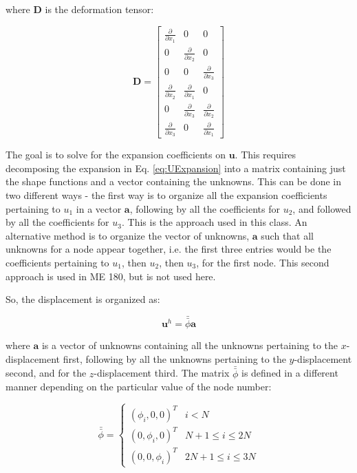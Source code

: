 \documentclass[10pt]{article}
\begin{document}
where \(\textbf{D}\) is the deformation tensor:

\begin{equation}
\label{eq:D}
\textbf{D}=\begin{bmatrix}\frac{\partial}{\partial x_1} & 0 & 0\\
0 & \frac{\partial}{\partial x_2} & 0\\
0 & 0 & \frac{\partial}{\partial x_3}\\
\frac{\partial}{\partial x_2} & \frac{\partial}{\partial x_1} & 0\\
0 & \frac{\partial}{\partial x_3} & \frac{\partial}{\partial x_2}\\
\frac{\partial}{\partial x_3} & 0 & \frac{\partial}{\partial x_1}\end{bmatrix}
\end{equation}

The goal is to solve for the expansion coefficients on \(\textbf{u}\). This requires decomposing the expansion in Eq. \eqref{eq:UExpansion} into a matrix containing just the shape functions and a vector containing the unknowns. This can be done in two different ways - the first way is to organize all the expansion coefficients pertaining to \(u_1\) in a vector \(\textbf{a}\), following by all the coefficients for \(u_2\), and followed by all the coefficients for \(u_3\). This is the approach used in this class. An alternative method is to organize the vector of unknowns, \(\textbf{a}\) such that all unknowns for a node appear together, i.e. the first three entries would be the coefficients pertaining to \(u_1\), then \(u_2\), then \(u_3\), for the first node. This second approach is used in ME 180, but is not used here.

So, the displacement is organized as:

\begin{equation}
\textbf{u}^h=\bar{\bar{\phi}}\textbf{a}
\end{equation}

where \(\textbf{a}\) is a vector of unknowns containing all the unknowns pertaining to the \(x\)-displacement first, following by all the unknowns pertaining to the \(y\)-displacement second, and for the \(z\)-displacement third. The matrix \(\bar{\bar{\phi}}\) is defined in a different manner depending on the particular value of the node number:

\begin{equation}
\bar{\bar{\phi}}=
\begin{cases}(\phi_i, 0, 0)^T & i < N\\(0, \phi_i, 0)^T & N+1\leq i\leq 2N \\ (0, 0, \phi_i)^T & 2N+1\leq i\leq 3N
\end{cases}
\end{equation}
\end{document}
